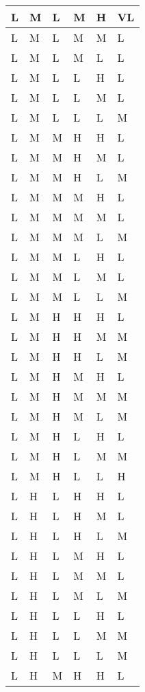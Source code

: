 \begin{center}
\begin{longtable}{| l | l | l | l | l | l |}
    L & M & L & M & H & VL \\ \hline 
    L & M & L & M & M & L \\ \hline 
    L & M & L & M & L & L \\ \hline 
    L & M & L & L & H & L \\ \hline 
    L & M & L & L & M & L \\ \hline 
    L & M & L & L & L & M \\ \hline 
    L & M & M & H & H & L \\ \hline 
    L & M & M & H & M & L \\ \hline 
    L & M & M & H & L & M \\ \hline 
    L & M & M & M & H & L \\ \hline 
    L & M & M & M & M & L \\ \hline 
    L & M & M & M & L & M \\ \hline 
    L & M & M & L & H & L \\ \hline 
    L & M & M & L & M & L \\ \hline 
    L & M & M & L & L & M \\ \hline 
    L & M & H & H & H & L \\ \hline 
    L & M & H & H & M & M \\ \hline 
    L & M & H & H & L & M \\ \hline 
    L & M & H & M & H & L \\ \hline 
    L & M & H & M & M & M \\ \hline 
    L & M & H & M & L & M \\ \hline 
    L & M & H & L & H & L \\ \hline 
    L & M & H & L & M & M \\ \hline 
    L & M & H & L & L & H \\ \hline 
    L & H & L & H & H & L \\ \hline 
    L & H & L & H & M & L \\ \hline 
    L & H & L & H & L & M \\ \hline 
    L & H & L & M & H & L \\ \hline 
    L & H & L & M & M & L \\ \hline 
    L & H & L & M & L & M \\ \hline 
    L & H & L & L & H & L \\ \hline 
    L & H & L & L & M & M \\ \hline 
    L & H & L & L & L & M \\ \hline 
    L & H & M & H & H & L \\ \hline 

\end{longtable}
\end{center}
